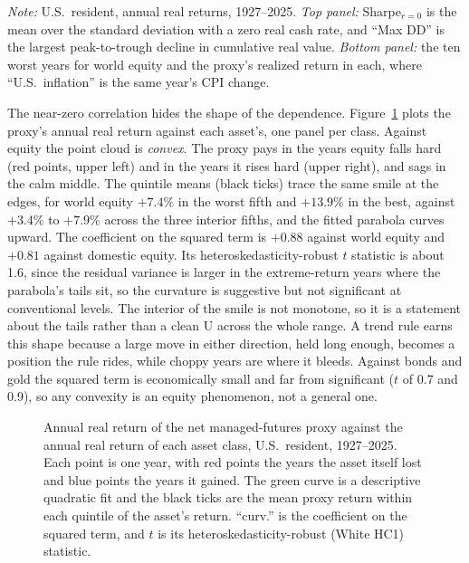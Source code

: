 \documentclass[11pt]{article}
\begin{document}
\begin{table}[H]
\centering
\caption{The managed-futures proxy against the other asset classes}
\label{tab:mf-diagnostics}
\small

\begin{minipage}{0.94\textwidth}\footnotesize
\textit{Note:} U.S.\ resident, annual real returns, 1927--2025. \emph{Top
panel:} Sharpe$_{r=0}$ is the mean over the standard deviation with a zero real
cash rate, and ``Max DD'' is the largest peak-to-trough decline in cumulative
real value. \emph{Bottom panel:} the ten worst years for world equity and the
proxy's realized return in each, where ``U.S.\ inflation'' is the same year's
CPI change.
\end{minipage}
\end{table}

The near-zero correlation hides the shape of the dependence.
Figure~\ref{fig:mf-convexity} plots the proxy's annual real return against each
asset's, one panel per class. Against equity the point cloud is \emph{convex}.
The proxy pays in the years equity falls hard (red points, upper left) and in
the years it rises hard (upper right), and sags in the calm middle. The
quintile means (black ticks) trace the same smile at the edges, for world
equity $+7.4\%$ in the worst fifth and $+13.9\%$ in the best, against $+3.4\%$
to $+7.9\%$ across the three interior fifths, and the fitted parabola curves
upward. The coefficient on the squared term is $+0.88$ against world equity and
$+0.81$ against domestic equity. Its heteroskedasticity-robust $t$ statistic is
about 1.6, since the residual variance is larger in the extreme-return years
where the parabola's tails sit, so the curvature is suggestive but not
significant at conventional levels. The interior of the smile is not monotone,
so it is a statement about the tails rather than a clean U across the whole
range. A trend rule earns this shape because a large move in either direction,
held long enough, becomes a position the rule rides, while choppy years are
where it bleeds. Against bonds and gold the squared term is economically small
and far from significant ($t$ of 0.7 and 0.9), so any convexity is an
equity phenomenon, not a general one.

\begin{figure}[H]
\centering

\caption{Annual real return of the net managed-futures proxy against the annual
real return of each asset class, U.S.\ resident, 1927--2025. Each point is one
year, with red points the years the asset itself lost and blue points the years
it gained. The green curve is a descriptive quadratic fit and the black ticks
are the mean proxy return within each quintile of the asset's return. ``curv.''
is the coefficient on the squared term, and $t$ is its
heteroskedasticity-robust (White HC1) statistic.}
\label{fig:mf-convexity}
\end{figure}
\end{document}
